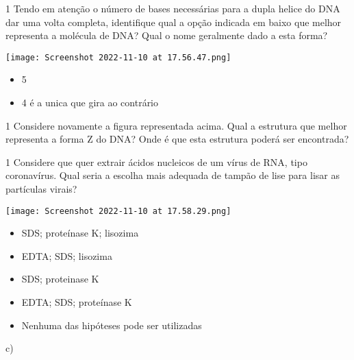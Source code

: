 \documentclass[\mainfilename]{subfiles}
\begin{document}
\begin{questionBox}1{ %
    Tendo em atenção o número de bases necessárias para a dupla helice do DNA dar uma volta completa, identifique qual a opção indicada em baixo que melhor representa a molécula de DNA? Qual o nome geralmente dado a esta forma?
} %
    
    \begin{center}
        \texttt{[image: Screenshot 2022-11-10 at 17.56.47.png]}
    \end{center}

    \begin{itemize}
        \item 5
        \item 4 é a unica que gira ao contrário
    \end{itemize}

\end{questionBox}

\begin{questionBox}1{ %
    Considere novamente a figura representada acima. Qual a estrutura que melhor representa a forma Z do DNA? Onde é que esta estrutura poderá ser encontrada?
} %
\end{questionBox}

\begin{questionBox}1{ %
    Considere que quer extrair ácidos nucleicos de um vírus de RNA, tipo coronavírus. Qual seria a escolha mais adequada de tampão de lise para lisar as partículas virais?
} %
    
    \begin{center}
        \texttt{[image: Screenshot 2022-11-10 at 17.58.29.png]}
    \end{center}

    \begin{itemize}[label=.]
        \item SDS; proteínase K; lisozima
        \item EDTA; SDS; lisozima
        \item SDS; proteinase K
        \item EDTA; SDS; proteínase K
        \item Nenhuma das hipóteses pode ser utilizadas
    \end{itemize}

    c)

\end{questionBox}
\end{document}
